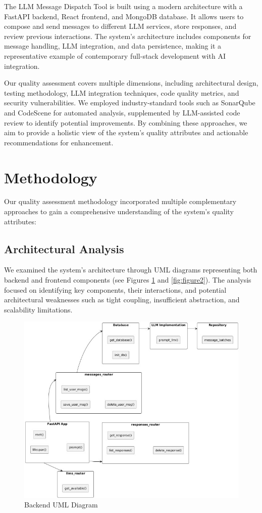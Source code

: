\documentclass[sigconf]{acmart}
\begin{document}
The LLM Message Dispatch Tool is built using a modern architecture with a FastAPI backend, React frontend, and MongoDB database. It allows users to compose and send messages to different LLM services, store responses, and review previous interactions. The system's architecture includes components for message handling, LLM integration, and data persistence, making it a representative example of contemporary full-stack development with AI integration.

Our quality assessment covers multiple dimensions, including architectural design, testing methodology, LLM integration techniques, code quality metrics, and security vulnerabilities. We employed industry-standard tools such as SonarQube and CodeScene for automated analysis, supplemented by LLM-assisted code review to identify potential improvements. By combining these approaches, we aim to provide a holistic view of the system's quality attributes and actionable recommendations for enhancement.

\section{Methodology}
Our quality assessment methodology incorporated multiple complementary approaches to gain a comprehensive understanding of the system's quality attributes:

\subsection{Architectural Analysis}
We examined the system's architecture through UML diagrams representing both backend and frontend components (see Figures \ref{fig:figure1} and \ref{fig:figure2}). The analysis focused on identifying key components, their interactions, and potential architectural weaknesses such as tight coupling, insufficient abstraction, and scalability limitations.

\begin{figure}[htbp]
    \centering
    \includegraphics[width=1\linewidth]{BackUML.jpg}
    \caption{Backend UML Diagram}
    \label{fig:figure1}
\end{figure}
\end{document}
